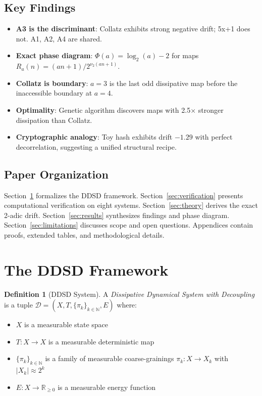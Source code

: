 \documentclass[11pt,a4paper]{article}
\theoremstyle{plain}
\theoremstyle{definition}
\newtheorem{definition}[theorem]{Definition}
\theoremstyle{remark}
\newcommand{\R}{\mathbb{R}}
\newcommand{\N}{\mathbb{N}}
\begin{document}
\subsection{Key Findings}

\begin{itemize}
    \item \textbf{A3 is the discriminant}: Collatz exhibits strong negative drift; 5x+1 does not. A1, A2, A4 are shared.
    \item \textbf{Exact phase diagram}: $\Phi(a) = \log_2(a) - 2$ for maps $R_a(n) = (an+1)/2^{\nu_2(an+1)}$.
    \item \textbf{Collatz is boundary}: $a=3$ is the last odd dissipative map before the inaccessible boundary at $a=4$.
    \item \textbf{Optimality}: Genetic algorithm discovers maps with 2.5$\times$ stronger dissipation than Collatz.
    \item \textbf{Cryptographic analogy}: Toy hash exhibits drift $-1.29$ with perfect decorrelation, suggesting a unified structural recipe.
\end{itemize}

\subsection{Paper Organization}

Section~\ref{sec:framework} formalizes the DDSD framework. Section~\ref{sec:verification} presents computational verification on eight systems. Section~\ref{sec:theory} derives the exact 2-adic drift. Section~\ref{sec:results} synthesizes findings and phase diagram. Section~\ref{sec:limitations} discusses scope and open questions. Appendices contain proofs, extended tables, and methodological details.

\section{The DDSD Framework}
\label{sec:framework}

\begin{definition}[DDSD System]
\label{def:ddsd}
A \emph{Dissipative Dynamical System with Decoupling} is a tuple $\mathcal{D} = (X, T, \{\pi_k\}_{k \in \N}, E)$ where:
\begin{itemize}
    \item $X$ is a measurable state space
    \item $T: X \to X$ is a measurable deterministic map
    \item $\{\pi_k\}_{k \in \N}$ is a family of measurable coarse-grainings $\pi_k: X \to X_k$ with $|X_k| \approx 2^k$
    \item $E: X \to \R_{\ge 0}$ is a measurable energy function
\end{itemize}
\end{definition}
\end{document}
